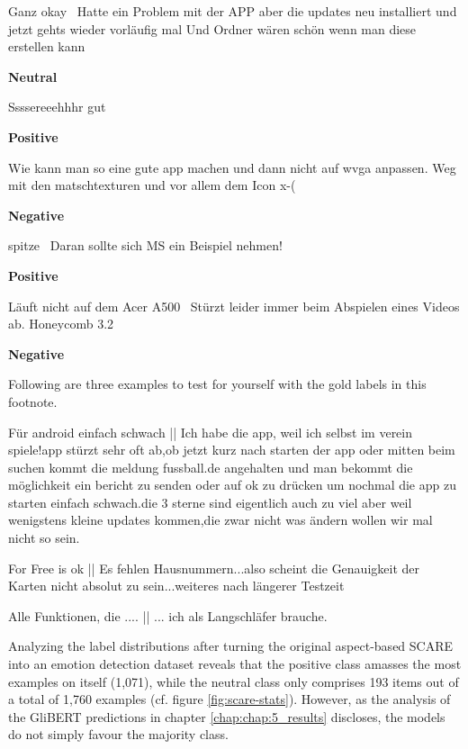\begin{examples}
  \item Ganz okay \textbar\textbar\ Hatte ein Problem mit der APP aber die updates neu installiert und jetzt gehts wieder vorläufig mal Und Ordner wären schön wenn man diese erstellen kann

        \textbf{Neutral}
  \item Ssssereeehhhr gut

        \textbf{Positive}
  \item Wie kann man so eine gute app machen und dann nicht auf wvga anpassen. Weg mit den matschtexturen und vor allem dem Icon x-(

        \textbf{Negative}
  \item spitze \textbar\textbar\ Daran sollte sich MS ein Beispiel nehmen!

        \textbf{Positive}
  \item Läuft nicht auf dem Acer A500 \textbar\textbar\ Stürzt leider immer beim Abspielen eines Videos ab. Honeycomb 3.2

        \textbf{Negative}
\end{examples}

Following are three examples to test for yourself with the gold labels in this
footnote.

\begin{examples}
  \item \label{itm:scare1} Für android einfach schwach || Ich habe die app, weil ich selbst im verein spiele!app stürzt sehr oft ab,ob jetzt kurz nach starten der app oder mitten beim suchen kommt die meldung fussball.de angehalten und man bekommt die möglichkeit ein bericht zu senden oder auf ok zu drücken um nochmal die app zu starten einfach schwach.die 3 sterne sind eigentlich auch zu viel aber weil wenigstens kleine updates kommen,die zwar nicht was ändern wollen wir mal nicht so sein.
  \item \label{itm:scare2} For Free is ok || Es fehlen Hausnummern...also scheint die Genauigkeit der Karten nicht absolut zu sein...weiteres nach längerer Testzeit
  \item \label{itm:scare3} Alle Funktionen, die .... || ... ich als Langschläfer brauche.
\end{examples}

Analyzing the label distributions after turning the original aspect-based SCARE into an emotion detection dataset
reveals that the positive class amasses the most examples on itself (1,071), while the neutral class only comprises
193 items out of a total of 1,760 examples (cf. figure \ref{fig:scare-stats}). However, as the analysis of the
GliBERT predictions in chapter \ref{chap:chap:5_results} discloses, the models do not simply favour the majority class.

